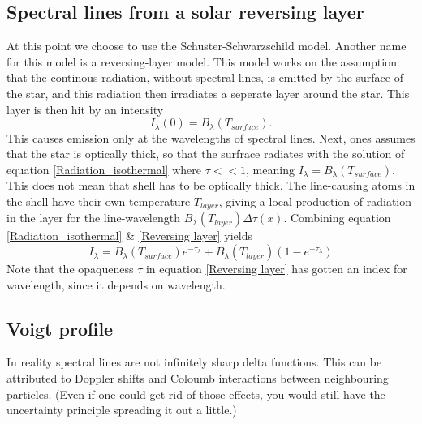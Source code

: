 \documentclass{aa}   %
\begin{document}
\subsection{Spectral lines from a solar reversing layer}
At this point we choose to use the Schuster-Schwarzschild model. Another name for this model is a reversing-layer model.
This model works on the assumption that the continous radiation, without spectral lines, is emitted by the surface of the star, and this radiation then irradiates a seperate layer around the star.
This layer is then hit by an intensity
\begin{equation}
 I_\lambda(0) = B_\lambda(T_{surface}).
\end{equation}\label{Surface layer}
This causes emission only at the wavelengths of spectral lines. 
Next, ones assumes that the star is optically thick, so that the surfrace radiates with the solution of equation \ref{Radiation_isothermal} where $\tau << 1$, meaning $I_\lambda = B_\lambda(T_{surface})$. This does not mean that shell has to be optically thick. The line-causing atoms in the shell have their own temperature $T_{layer}$, giving a local production of radiation in the layer for the line-wavelength $B_\lambda(T_{layer})\Delta\tau(x)$. Combining equation \ref{Radiation_isothermal} \& \ref{Reversing layer} yields
\begin{equation}
 I_\lambda =B_\lambda(T_{surface})e^{-\tau_\lambda} + B_\lambda(T_{layer})(1 - e^{-\tau_\lambda})
\end{equation}\label{Reversing layer}
Note that the opaqueness $\tau$ in equation \ref{Reversing layer} has gotten an index for wavelength, since it depends on wavelength.

\subsection{Voigt profile}
In reality spectral lines are not infinitely sharp delta functions. This can be attributed to Doppler shifts and Coloumb interactions between neighbouring particles. (Even if one could get rid of those effects, you would still have the uncertainty principle spreading it out a little.)
\end{document}
